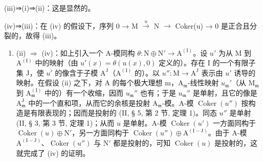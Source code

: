 (iii)⇒(i)⇒(ii)：这是显然的。

(iv)⇒(iii)：在 (iv) 的假设下，序列 0 → M \(\xrightarrow{u}\) N \(\longrightarrow\) Coker(u) → 0 是正合且分裂的，故得 (iii)。

\begin{enumerate}
\def\labelenumi{(\roman{enumi})}
\setcounter{enumi}{1}
\tightlist
\item
  (ii) \(\Rightarrow\) (iv)：如上引入一个 A-模同构 \(\theta: \mathrm{N} \oplus \mathrm{N}' \to \mathrm{A}^{(\mathrm{I})}\)。设 \(u'\) 为从 M 到 \(\mathrm{A}^{(\mathrm{I})}\) 中的映射（由 \(u'(x) = \theta(u(x), 0)\) 定义的）。存在 I 的一个有限子集 J，使 \(u'\) 的像含于子模 \(\mathrm{A}^{\mathrm{J}}\)（\(\mathrm{A}^{(\mathrm{I})}\) 的）。以 \(u'': \mathrm{M} \to \mathrm{A}^{\mathrm{J}}\) 表示由 \(u'\) 诱导的映射。在假设 (ii) 之下，对 A 的每个极大理想 m，\(\mathrm{A}_{\mathfrak{m}}\)-线性映射 \(u_{\mathfrak{m}}'\)（从 \(\mathrm{M}_{\mathfrak{m}}\) 到 \(\mathrm{A}_{\mathfrak{m}}^{(\mathrm{I})}\) 中的）有一个收缩，因而 \(u_{\mathfrak{m}}''\) 也有；于是 \(u_{\mathfrak{m}}''\) 是单射，且它的像是 \(\mathrm{A}_{\mathfrak{m}}^{\mathrm{J}}\) 中的一个直和项，从而它的余核是投射 \(\mathrm{A}_{\mathfrak{m}}\)-模。A-模 \(\operatorname{Coker}(u'')\) 按构造是有限表现的；因而是投射的 (II, § 5, 第 2 节, 定理 1)。同态 \(u''\) 是单射 (II, § 3, 第 3 节, 定理 1)；从而 \(u\) 是单射。A-模 \(\operatorname{Coker}(u')\) 一方面同构于 \(\operatorname{Coker}(u) \oplus \mathrm{N}'\)，另一方面同构于 \(\operatorname{Coker}(u'') \oplus \mathrm{A}^{(\mathrm{I}-\mathrm{J})}\)。由于 A-模 \(\mathrm{A}^{(\mathrm{I}-\mathrm{J})}\)、\(\operatorname{Coker}(u'')\) 与 \(\mathrm{N}'\) 都是投射的，可知 \(\operatorname{Coker}(u)\) 是投射的，这就完成了 (iv) 的证明。
\end{enumerate}
\relax{}
